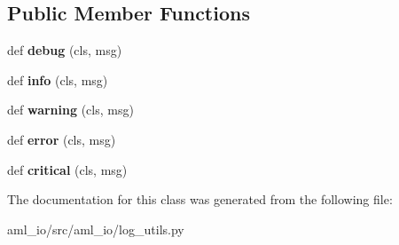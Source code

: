 \subsection*{Public Member Functions}
\begin{DoxyCompactItemize}
\item 
\hypertarget{classaml__io_1_1log__utils_1_1aml__logging_a841598eda325337f33a5f833384597ed}{}\label{classaml__io_1_1log__utils_1_1aml__logging_a841598eda325337f33a5f833384597ed} 
def {\bfseries debug} (cls, msg)
\item 
\hypertarget{classaml__io_1_1log__utils_1_1aml__logging_a35f613505f381c5c150211a19248897f}{}\label{classaml__io_1_1log__utils_1_1aml__logging_a35f613505f381c5c150211a19248897f} 
def {\bfseries info} (cls, msg)
\item 
\hypertarget{classaml__io_1_1log__utils_1_1aml__logging_a0d9a6a65dbc9e3d266a6bf8791ddd1c3}{}\label{classaml__io_1_1log__utils_1_1aml__logging_a0d9a6a65dbc9e3d266a6bf8791ddd1c3} 
def {\bfseries warning} (cls, msg)
\item 
\hypertarget{classaml__io_1_1log__utils_1_1aml__logging_ab88893a3ae1aa41bdf4c401af9f8a3b4}{}\label{classaml__io_1_1log__utils_1_1aml__logging_ab88893a3ae1aa41bdf4c401af9f8a3b4} 
def {\bfseries error} (cls, msg)
\item 
\hypertarget{classaml__io_1_1log__utils_1_1aml__logging_a2c3d6b9d2cc80d959da7f12cdf02a633}{}\label{classaml__io_1_1log__utils_1_1aml__logging_a2c3d6b9d2cc80d959da7f12cdf02a633} 
def {\bfseries critical} (cls, msg)
\end{DoxyCompactItemize}


The documentation for this class was generated from the following file\+:\begin{DoxyCompactItemize}
\item 
aml\+\_\+io/src/aml\+\_\+io/log\+\_\+utils.\+py\end{DoxyCompactItemize}
